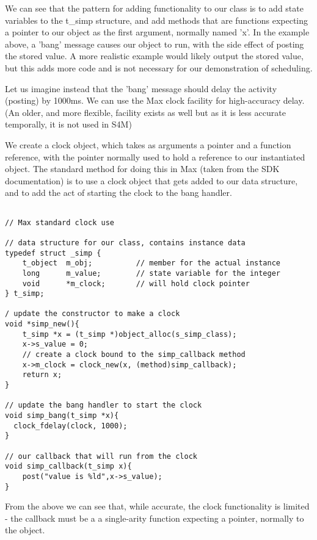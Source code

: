 \documentclass[acmsmall]{acmart}
\begin{document}
We can see that the pattern for adding functionality to our class is to
add state variables to the t\_simp structure, and add methods that are
functions expecting a pointer to our object as the first argument,
normally named 'x'. In the example above, a 'bang' message causes our
object to run, with the side effect of posting the stored value. A more
realistic example would likely output the stored value, but this adds more code
and is not necessary for our demonstration of scheduling.

Let us imagine instead that the 'bang' message should delay the activity
(posting) by 1000ms. We can use the Max clock facility for high-accuracy
delay. (An older, and more flexible, facility exists as well but as it is
less accurate temporally, it is not used in S4M) 

We create a clock object, which takes as arguments a pointer and a function
reference, with the pointer normally used to hold a reference to our instantiated
object. The standard method for doing this in Max (taken from the SDK documentation)
is to use a clock object that gets added to our data structure, and to add the act
of starting the clock to the bang handler.

\begin{verbatim}

// Max standard clock use

// data structure for our class, contains instance data
typedef struct _simp {
    t_object  m_obj;          // member for the actual instance 
    long      m_value;        // state variable for the integer
    void      *m_clock;       // will hold clock pointer
} t_simp;

/ update the constructor to make a clock
void *simp_new(){
    t_simp *x = (t_simp *)object_alloc(s_simp_class);
    x->s_value = 0;
    // create a clock bound to the simp_callback method
    x->m_clock = clock_new(x, (method)simp_callback); 
    return x;
}

// update the bang handler to start the clock
void simp_bang(t_simp *x){
  clock_fdelay(clock, 1000);
}

// our callback that will run from the clock
void simp_callback(t_simp x){
    post("value is %ld",x->s_value);
}

\end{verbatim}

From the above we can see that, while accurate, the clock functionality is limited -
the callback must be a a single-arity function expecting a pointer, normally to the object.
\end{document}

